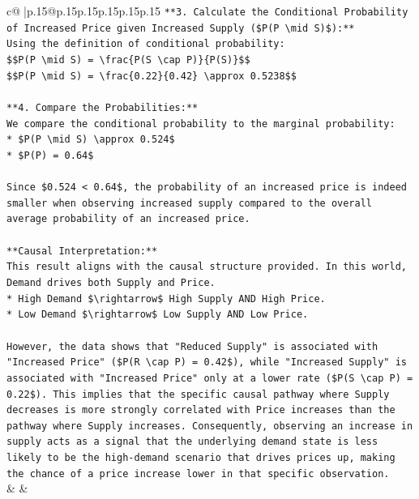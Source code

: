 \documentclass{article}
\begin{document}
{\begin{supertabular}{c@{$\;$}|p{.15\linewidth}@{}p{.15\linewidth}p{.15\linewidth}p{.15\linewidth}p{.15\linewidth}p{.15\linewidth}}
{{{\texttt{**3. Calculate the Conditional Probability of Increased Price given Increased Supply (\$P(P \textbackslash{}mid S)\$):**} \\
\texttt{Using the definition of conditional probability:} \\
\texttt{\$\$P(P \textbackslash{}mid S) = \textbackslash{}frac\{P(S \textbackslash{}cap P)\}\{P(S)\}\$\$} \\
\texttt{\$\$P(P \textbackslash{}mid S) = \textbackslash{}frac\{0.22\}\{0.42\} \textbackslash{}approx 0.5238\$\$} \\
\\ 
\texttt{**4. Compare the Probabilities:**} \\
\texttt{We compare the conditional probability to the marginal probability:} \\
\texttt{*   \$P(P \textbackslash{}mid S) \textbackslash{}approx 0.524\$} \\
\texttt{*   \$P(P) = 0.64\$} \\
\\ 
\texttt{Since \$0.524 < 0.64\$, the probability of an increased price is indeed smaller when observing increased supply compared to the overall average probability of an increased price.} \\
\\ 
\texttt{**Causal Interpretation:**} \\
\texttt{This result aligns with the causal structure provided. In this world, Demand drives both Supply and Price.} \\
\texttt{*   High Demand \$\textbackslash{}rightarrow\$ High Supply AND High Price.} \\
\texttt{*   Low Demand \$\textbackslash{}rightarrow\$ Low Supply AND Low Price.} \\
\\ 
\texttt{However, the data shows that "Reduced Supply" is associated with "Increased Price" (\$P(R \textbackslash{}cap P) = 0.42\$), while "Increased Supply" is associated with "Increased Price" only at a lower rate (\$P(S \textbackslash{}cap P) = 0.22\$). This implies that the specific causal pathway where Supply decreases is more strongly correlated with Price increases than the pathway where Supply increases. Consequently, observing an increase in supply acts as a signal that the underlying demand state is less likely to be the high{-}demand scenario that drives prices up, making the chance of a price increase lower in that specific observation.} \\
            }
        }
    }
    & & \\ \\


\end{supertabular}}
\end{document}

